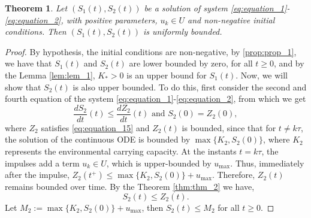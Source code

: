 \documentclass[10pt,letterpaper]{article}
\newtheorem{theorem}{Theorem}
\begin{document}
\begin{theorem}\label{prop:prop_3}
    Let $(S_1(t),S_2(t))$ be a solution of system \eqref{eq:equation_1}-\eqref{eq:equation_2}, with positive parameters, $u_k \in U$ and non-negative initial conditions. Then $(S_1(t),S_2(t))$ is uniformly  bounded.
\end{theorem}
\begin{proof}
By hypothesis, the initial conditions are non-negative, by \eqref{prop:prop_1}, we have that $S_1(t)$ and $S_2(t)$ are lower bounded by zero, for all $t \geq 0 $, and by the Lemma \eqref{lem:lem_1}, $K_*>0$ is an upper bound for $S_1(t)$. Now, we will show that $S_2(t)$ is also upper bounded. To do this, first consider the second and fourth equation of the system \eqref{eq:equation_1}-\eqref{eq:equation_2}, from which we get
\begin{equation}\label{eq:equation_19}
    \dfrac{dS_2}{dt}(t) \leq \dfrac{dZ_2}{dt}(t) \mbox{ and } S_2(0) = Z_2(0),
\end{equation} 
where $Z_2$ satisfies \eqref{eq:equation_15} and $Z_2(t)$ is bounded, since that for $t \neq k\tau$, the solution of the continuous ODE is bounded by $\max\{K_2, S_2(0)\}$, where $K_2$ represents the environmental carrying capacity. At the instants $t = k\tau$, the impulses add a term $u_k \in U$, which is upper-bounded by $u_{\max}$. Thus, immediately after the impulse, $Z_2(t^+) \leq \max\{K_2, S_2(0)\}+u_{\max}$. Therefore, $Z_2(t)$ remains bounded over time. By the Theorem \eqref{thm:thm_2} we have,
\begin{equation}\label{eq:equation_20}
    S_2(t)\leq Z_2(t).
\end{equation} Let $M_2 := \max\{K_2, S_2(0)\}+u_{\max}$, then $S_2(t)\leq M_2$ for all $t \geq 0$.


\end{proof}
\end{document}
